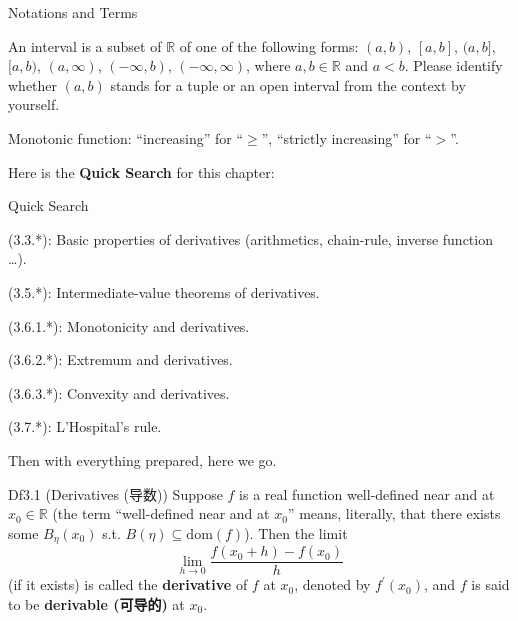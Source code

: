 \documentclass{article}
\begin{document}
\begin{Df}{Notations and Terms}
\begin{compactenum}
        \item An interval is a subset of $\mathbb{R}$ of one of the following forms: $(a,b)$, $[a,b]$, $(a,b]$, $[a,b)$, $(a, \infty)$, $(-\infty, b)$, $(-\infty, \infty)$, where $a, b\in\mathbb{R}$ and $a<b$. Please identify whether $(a,b)$ stands for a tuple or an open interval from the context by yourself.
        \item Monotonic function: ``increasing'' for ``$\geq$'', ``strictly increasing'' for ``$>$''.
    \end{compactenum}
\end{Df}

Here is the \textbf{Quick Search} for this chapter:
\begin{Th}{Quick Search}
    \begin{compactdesc}
        \item[] (3.3.*): Basic properties of derivatives (arithmetics, chain-rule, inverse function \dots).
        \item[] (3.5.*): Intermediate-value theorems of derivatives.
        \item[] (3.6.1.*): Monotonicity and derivatives.
        \item[] (3.6.2.*): Extremum and derivatives.
        \item[] (3.6.3.*): Convexity and derivatives.
        \item[] (3.7.*): L'Hospital's rule.
    \end{compactdesc}
\end{Th}

Then with everything prepared, here we go.

\begin{Df}{Df3.1 (Derivatives (导数))}
    Suppose $f$ is a real function well-defined near and at $x_0\in\mathbb{R}$ (the term ``well-defined near and at $x_0$'' means, literally, that there exists some $B_\eta(x_0)$ s.t. $B(\eta)\subseteq \text{dom}(f)$). Then the limit
    $$ \lim_{h\to 0} \frac{f(x_0+h)-f(x_0)}{h} $$
    (if it exists) is called the \textbf{derivative} of $f$ at $x_0$, denoted by $f^\prime(x_0)$, and $f$ is said to be \textbf{derivable (可导的)} at $x_0$. 
\end{Df}
\end{document}
